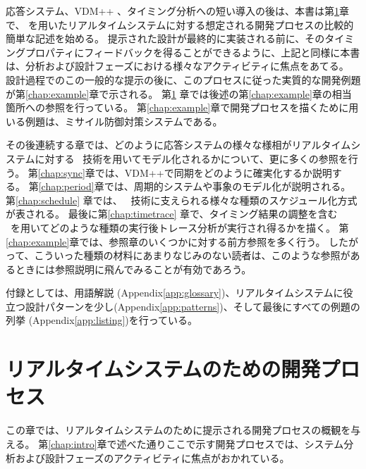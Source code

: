 \documentclass[\pformat,12pt]{jreport}
\begin{document}
応答システム、VDM++ 、タイミング分析への短い導入の後は、本書は第\ref{chap:process}章で、 \VDMTools を用いたリアルタイムシステムに対する想定される開発プロセスの比較的簡単な記述を始める。
提示された設計が最終的に実装される前に、そのタイミングプロパティにフィードバックを得ることができるように、上記と同様に本書は、分析および設計フェーズにおける様々なアクティビティに焦点をあてる。
設計過程でのこの一般的な提示の後に、このプロセスに従った実質的な開発例題が第\ref{chap:example}章で示される。
第\ref{chap:process} 章では後述の第\ref{chap:example}章の相当箇所への参照を行っている。
第\ref{chap:example}章で開発プロセスを描くために用いる例題は、ミサイル防御対策システムである。

その後連続する章では、どのように応答システムの様々な様相がリアルタイムシステムに対する \VDMTools\ 技術を用いてモデル化されるかについて、更に多くの参照を行う。
第\ref{chap:sync}章では、VDM++で同期をどのように確実化するか説明する。
第\ref{chap:period}章では、周期的システムや事象のモデル化が説明される。
第\ref{chap:schedule} 章では、 \VDMTools\ 技術に支えられる様々な種類のスケジュール化方式が表される。
最後に第\ref{chap:timetrace} 章で、タイミング結果の調整を含む　\VDMTools\ を用いてどのような種類の実行後トレース分析が実行され得るかを描く。
第\ref{chap:example}章では、参照章のいくつかに対する前方参照を多く行う。
したがって、こういった種類の材料にあまりなじみのない読者は、このような参照があるときには参照説明に飛んでみることが有効であろう。

付録としては、用語解説 (Appendix\ref{app:glossary})、リアルタイムシステムに役立つ設計パターンを少し(Appendix\ref{app:patterns})、そして最後にすべての例題の列挙 (Appendix\ref{app:listing})を行っている。

\chapter{リアルタイムシステムのための開発プロセス}\label{chap:process}

この章では、リアルタイムシステムのために提示される開発プロセスの概観を与える。
第\ref{chap:intro}章で述べた通りここで示す開発プロセスでは、システム分析および設計フェーズのアクティビティに焦点がおかれている。
\end{document}
